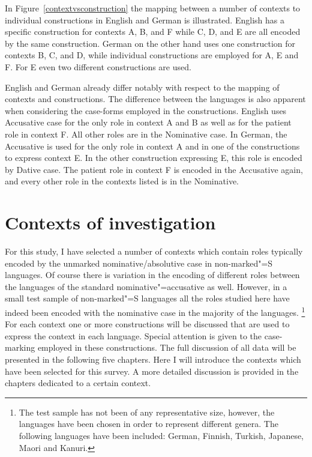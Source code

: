 In Figure~\ref{contextvsconstruction} the mapping between a number of contexts to individual constructions in English and German is illustrated. English has a specific construction for contexts A, B, and F while C, D, and E are all encoded by the same construction. 
German on the other hand uses one construction for contexts B, C, and D, while individual constructions are employed for A, E and F. For E even two different constructions are used.

English and German already differ notably with respect to the mapping of contexts and constructions. 
The difference between the languages is also apparent when considering the case-forms employed in the constructions. 
English uses Accusative case for the only role in context A and B as well as for the patient role in context F.
All other roles are in the Nominative case. 
In German, the Accusative is used for the only role in context A and in one of the constructions to express context E. 
In the other construction expressing E, this role is encoded by Dative case.
The patient role in context F is encoded in the Accusative again, and every other role in the contexts listed is in the Nominative.  

\section{Contexts of investigation}\label{contexts}

For this study, I have selected a number of contexts which contain roles typically encoded by the unmarked nominative/absolutive case in non-marked"=S languages.
Of course there is variation in the encoding of different roles between the languages of the standard nominative"=accusative as well. 
However, in a small test sample of non-marked"=S languages all the roles studied here have indeed been encoded with the nominative case in the majority of the languages.
\footnote{The test sample has not been of any representative size, however, the languages have been chosen in order to represent different genera. 
The following languages have been included: German, Finnish, Turkish, Japanese, Maori and Kanuri.} 
For each context one or more constructions will be discussed that are used to express the context in each language. 
Special attention is given to the case-marking employed in these constructions.
The full discussion of all data will be presented in the following five chapters. 
Here I will introduce the contexts which have been selected for this survey. 
A more detailed discussion is provided in the chapters dedicated to a certain context. 

